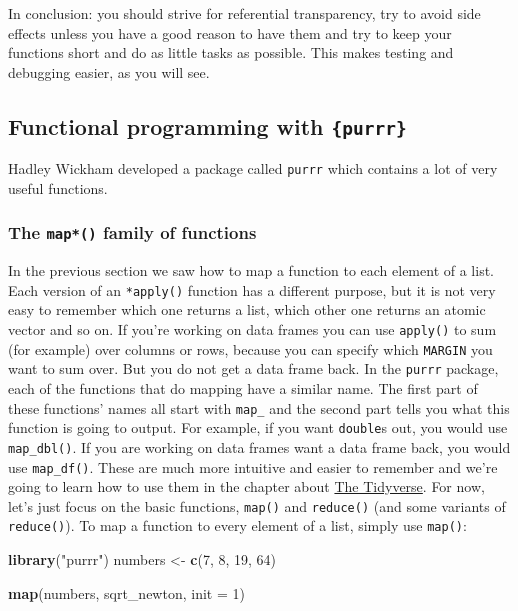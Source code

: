 \documentclass[]{gitbook}
\newenvironment{Shaded}{\begin{snugshade}}{\end{snugshade}}
\newcommand{\DataTypeTok}[1]{\textcolor[rgb]{0.13,0.29,0.53}{#1}}
\newcommand{\DecValTok}[1]{\textcolor[rgb]{0.00,0.00,0.81}{#1}}
\newcommand{\KeywordTok}[1]{\textcolor[rgb]{0.13,0.29,0.53}{\textbf{#1}}}
\newcommand{\NormalTok}[1]{#1}
\newcommand{\StringTok}[1]{\textcolor[rgb]{0.31,0.60,0.02}{#1}}
\theoremstyle{definition}
\theoremstyle{definition}
\theoremstyle{definition}
\theoremstyle{remark}
\begin{document}
In conclusion: you should strive for referential transparency, try to
avoid side effects unless you have a good reason to have them and try to
keep your functions short and do as little tasks as possible. This makes
testing and debugging easier, as you will see.

\hypertarget{functional-programming-with-purrr}{%
\subsection{\texorpdfstring{Functional programming with
\texttt{\{purrr\}}}{Functional programming with \{purrr\}}}\label{functional-programming-with-purrr}}

Hadley Wickham developed a package called \texttt{purrr} which contains
a lot of very useful functions.

\hypertarget{the-map-family-of-functions}{%
\subsubsection{\texorpdfstring{The \texttt{map*()} family of
functions}{The map*() family of functions}}\label{the-map-family-of-functions}}

In the previous section we saw how to map a function to each element of
a list. Each version of an \texttt{*apply()} function has a different
purpose, but it is not very easy to remember which one returns a list,
which other one returns an atomic vector and so on. If you're working on
data frames you can use \texttt{apply()} to sum (for example) over
columns or rows, because you can specify which \texttt{MARGIN} you want
to sum over. But you do not get a data frame back. In the \texttt{purrr}
package, each of the functions that do mapping have a similar name. The
first part of these functions' names all start with \texttt{map\_} and
the second part tells you what this function is going to output. For
example, if you want \texttt{double}s out, you would use
\texttt{map\_dbl()}. If you are working on data frames want a data frame
back, you would use \texttt{map\_df()}. These are much more intuitive
and easier to remember and we're going to learn how to use them in the
chapter about \protect\hyperlink{tidyverse}{The Tidyverse}. For now,
let's just focus on the basic functions, \texttt{map()} and
\texttt{reduce()} (and some variants of \texttt{reduce()}). To map a
function to every element of a list, simply use \texttt{map()}:

\begin{Shaded}
\begin{Highlighting}[]
\KeywordTok{library}\NormalTok{(}\StringTok{"purrr"}\NormalTok{)}
\NormalTok{numbers <-}\StringTok{ }\KeywordTok{c}\NormalTok{(}\DecValTok{7}\NormalTok{, }\DecValTok{8}\NormalTok{, }\DecValTok{19}\NormalTok{, }\DecValTok{64}\NormalTok{)}

\KeywordTok{map}\NormalTok{(numbers, sqrt_newton, }\DataTypeTok{init =} \DecValTok{1}\NormalTok{)}
\end{Highlighting}
\end{Shaded}
\end{document}
